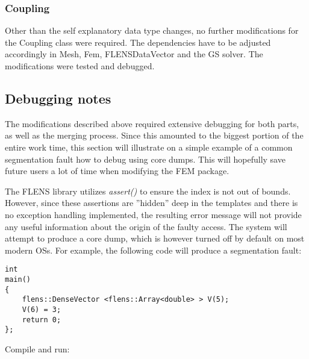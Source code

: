\subsubsection{Coupling}
Other than the self explanatory data type changes, no further modifications for the Coupling class were required. The dependencies have to be adjusted accordingly in Mesh, Fem, FLENSDataVector and the GS solver. The modifications were tested and debugged.

\subsection{Debugging notes}
The modifications described above required extensive debugging for both parts, as well as the merging process. Since this amounted to the biggest portion of the entire work time, this section will illustrate on a simple example of a common segmentation fault how to debug using core dumps. This will hopefully save future users a lot of time when modifying the FEM package.

The FLENS library utilizes \emph{assert()} to ensure the index is not out of bounds. However, since these assertions are ''hidden'' deep in the templates and there is no exception handling implemented, the resulting error message will not provide any useful information about the origin of the faulty access. The system will attempt to produce a core dump, which is however turned off by default on most modern OSs. For example, the following code will produce a segmentation fault:

\begin{lstlisting}
int
main()
{
	flens::DenseVector <flens::Array<double> > V(5);
	V(6) = 3;
	return 0;
};
\end{lstlisting}
Compile and run:

